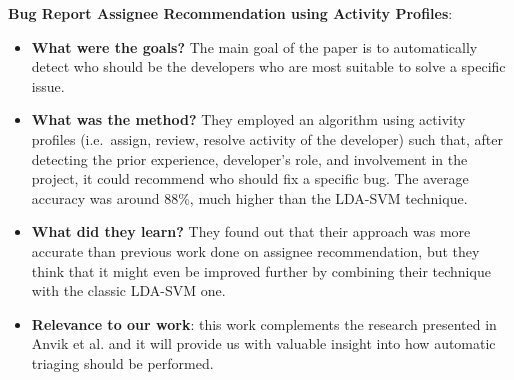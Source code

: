 \documentclass{mprop}
\begin{document}
\textbf{Bug Report Assignee Recommendation using 
Activity Profiles}\cite{Naguib2013BugReportAssignee}:
\begin{itemize}
  \item \textbf{What were the goals?}
    The main goal of the paper is to automatically detect who should be
    the developers who are most suitable to solve a specific issue.
  \item \textbf{What was the method?}
    They employed an algorithm using activity profiles (i.e.\ assign, review,
    resolve activity of the developer) such that, after detecting the prior
    experience, developer's role, and involvement in the project, it could
    recommend who should fix a specific bug. The average accuracy was around
    88\%, much higher than the LDA-SVM technique.
  \item \textbf{What did they learn?}
    They found out that their approach was more accurate than previous work
    done on assignee recommendation, but they think that it might even be
    improved further by combining their technique with the classic LDA-SVM one.
  \item \textbf{Relevance to our work}: this work complements the research
    presented in Anvik et al. \cite{anvik2006should} and it will provide us
    with valuable insight into how automatic triaging should be performed.
\end{itemize}
\end{document}
